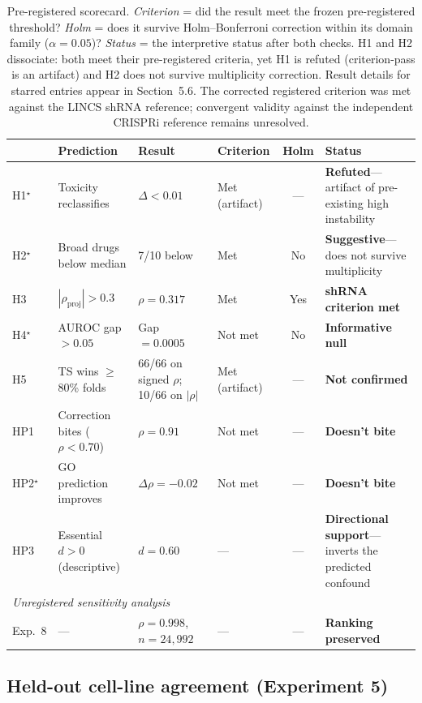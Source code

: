 \documentclass[11pt]{article}
\begin{document}
\begin{table}[t]
\centering
\caption{Pre-registered scorecard.
\emph{Criterion} = did the result meet the frozen pre-registered
threshold?
\emph{Holm} = does it survive Holm--Bonferroni correction within its
domain family ($\alpha = 0.05$)?
\emph{Status} = the interpretive status after both checks.
H1 and H2 dissociate: both meet their pre-registered criteria, yet H1
is refuted (criterion-pass is an artifact) and H2 does not survive
multiplicity correction.
Result details for starred entries appear in Section~5.6.
The corrected registered criterion was met against the LINCS shRNA reference;
convergent validity against the independent CRISPRi reference remains
unresolved.}
\label{tab:scorecard}
\small
\begin{tabular}{@{}lp{2.7cm}p{3.0cm}p{1.7cm}cp{3.3cm}@{}}
\toprule
 & Prediction & Result & Criterion & Holm & Status \\
\midrule
H1$^\star$ & Toxicity reclassifies & $\Delta < 0.01$ & Met (artifact) & --- & \textbf{Refuted}---artifact of pre-existing high instability \\
H2$^\star$ & Broad drugs below median & 7/10 below & Met & No & \textbf{Suggestive}---does not survive multiplicity \\
H3 & $|\rho_{\text{proj}}| > 0.3$ & $\rho = 0.317$ & Met & Yes & \textbf{shRNA criterion met} \\
H4$^\star$ & AUROC gap $> 0.05$ & Gap $= 0.0005$ & Not met & No & \textbf{Informative null} \\
H5 & TS wins $\geq$80\% folds & 66/66 on signed $\rho$; 10/66 on $|\rho|$ & Met (artifact) & --- & \textbf{Not confirmed} \\
\midrule
HP1 & Correction bites ($\rho < 0.70$) & $\rho = 0.91$ & Not met & --- & \textbf{Doesn't bite} \\
HP2$^\star$ & GO prediction improves & $\Delta\rho = -0.02$ & Not met & --- & \textbf{Doesn't bite} \\
HP3 & Essential $d > 0$ (descriptive) & $d = 0.60$ & --- & --- & \textbf{Directional support}---inverts the predicted confound \\
\midrule
\multicolumn{6}{l}{\emph{Unregistered sensitivity analysis}}\\
Exp.~8 & --- & $\rho = 0.998$, $n = 24{,}992$ & --- & --- & \textbf{Ranking preserved} \\
\bottomrule
\end{tabular}
\end{table}

\subsection{Held-out cell-line agreement (Experiment 5)}
\label{sec:exp5}
\end{document}
